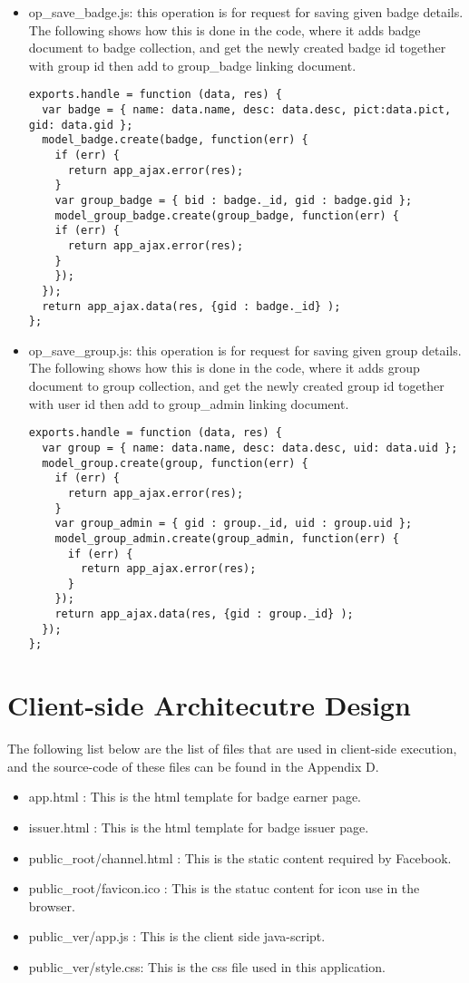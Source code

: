\begin{itemize}
\item op{\_}save{\_}badge.js: this operation is for request for saving given badge details. The following shows how this is done in the code, where it adds badge document to badge collection, and get the newly created badge id together with group id then add to group{\_}badge linking document. 

\begin{lstlisting}
exports.handle = function (data, res) {
  var badge = { name: data.name, desc: data.desc, pict:data.pict, gid: data.gid };
  model_badge.create(badge, function(err) {
    if (err) {
      return app_ajax.error(res);
    }
    var group_badge = { bid : badge._id, gid : badge.gid };
    model_group_badge.create(group_badge, function(err) {
    if (err) {
      return app_ajax.error(res);
    }
    });
  });
  return app_ajax.data(res, {gid : badge._id} );  
};
\end{lstlisting}

\item op{\_}save{\_}group.js: this operation is for request for saving given group details. The following shows how this is done in the code, where it adds group document to group collection, and get the newly created group id together with user id then add to group{\_}admin linking document. 

\begin{lstlisting}
exports.handle = function (data, res) {
  var group = { name: data.name, desc: data.desc, uid: data.uid };
  model_group.create(group, function(err) {
    if (err) {
      return app_ajax.error(res);
    }
    var group_admin = { gid : group._id, uid : group.uid };
    model_group_admin.create(group_admin, function(err) {
      if (err) {
        return app_ajax.error(res);
      }      
    });
    return app_ajax.data(res, {gid : group._id} );
  });
};
\end{lstlisting}

\end{itemize}

\section{Client-side Architecutre Design}
The following list below are the list of files that are used in client-side execution, and the source-code of these files can be found in the Appendix D.

\begin{itemize}
\item app.html : This is the html template for badge earner page.
\item issuer.html : This is the html template for badge issuer page.
\item public{\_}root/channel.html : This is the static content required by Facebook. 
\item public{\_}root/favicon.ico : This is the statuc content for icon use in the browser.
\item public{\_}ver/app.js : This is the client side java-script. 
\item public{\_}ver/style.css: This is the css file used in this application.
\end{itemize}
